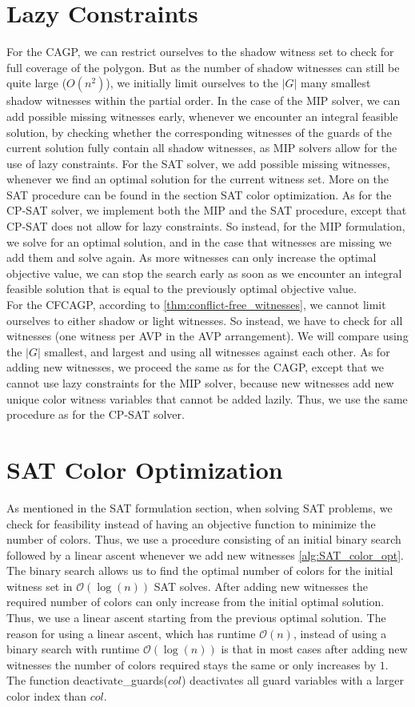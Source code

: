 \section{Lazy Constraints}
For the CAGP, we can restrict ourselves to the shadow witness set to check for full coverage of the polygon. But as the number of shadow witnesses can still be quite large ($O(n^2)$), we initially limit ourselves to the $|G|$ many smallest shadow witnesses within the partial order. In the case of the MIP solver, we can add possible missing witnesses early, whenever we encounter an integral feasible solution, by checking whether the corresponding witnesses of the guards of the current solution fully contain all shadow witnesses, as MIP solvers allow for the use of lazy constraints. For the SAT solver, we add possible missing witnesses, whenever we find an optimal solution for the current witness set. More on the SAT procedure can be found in the section SAT color optimization. As for the CP-SAT solver, we implement both the MIP and the SAT procedure, except that CP-SAT does not allow for lazy constraints. So instead, for the MIP formulation, we solve for an optimal solution, and in the case that witnesses are missing we add them and solve again. As more witnesses can only increase the optimal objective value, we can stop the search early as soon as we encounter an integral feasible solution that is equal to the previously optimal objective value.\\
For the CFCAGP, according to \cref{thm:conflict-free_witnesses}, we cannot limit ourselves to either shadow or light witnesses. So instead, we have to check for all witnesses (one witness per AVP in the AVP arrangement). We will compare using the $|G|$ smallest, and largest and using all witnesses against each other. As for adding new witnesses, we proceed the same as for the CAGP, except that we cannot use lazy constraints for the MIP solver, because new witnesses add new unique color witness variables that cannot be added lazily. Thus, we use the same procedure as for the CP-SAT solver.

\section{SAT Color Optimization}
As mentioned in the SAT formulation section, when solving SAT problems, we check for feasibility instead of having an objective function to minimize the number of colors. Thus, we use a procedure consisting of an initial binary search followed by a linear ascent whenever we add new witnesses \cref{alg:SAT_color_opt}. The binary search allows us to find the optimal number of colors for the initial witness set in $\mathcal{O}(\log(n))$ SAT solves. After adding new witnesses the required number of colors can only increase from the initial optimal solution. Thus, we use a linear ascent starting from the previous optimal solution. The reason for using a linear ascent, which has runtime $\mathcal{O}(n)$, instead of using a binary search with runtime $\mathcal{O}(\log(n))$ is that in most cases after adding new witnesses the number of colors required stays the same or only increases by $1$. The function deactivate\_guards($col$) deactivates all guard variables with a larger color index than $col$.

